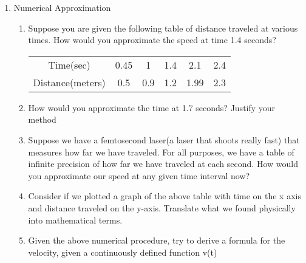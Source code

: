\documentclass{article}
\begin{document}
\begin{enumerate}
    \item Numerical Approximation
    \begin{enumerate}
        \item Suppose you are given the following table of distance traveled at various times. How would you approximate the speed at time 1.4 seconds?
        \begin{center}
            \begin{tabular}{ c c c c c c}
             Time(sec)        & 0.45  &   1   & 1.4  & 2.1  & 2.4\\ 
             Distance(meters) & 0.5   &  0.9  &  1.2 & 1.99 & 2.3\\  
            \end{tabular}
        \end{center}
        \item How would you approximate the time at 1.7 seconds? Justify your method
        \item Suppose we have a femtosecond laser(a laser that shoots really fast) that measures how far we have traveled. For all purposes, we have a table of infinite precision of how far we have traveled at each second. How would you approximate our speed at any given time interval now?
        \item Consider if we plotted a graph of the above table with time on the x axis and distance traveled on the y-axis. Translate what we found physically into mathematical terms.
        \item Given the above numerical procedure, try to derive a formula for the velocity, given a continuously defined function v(t)
    \end{enumerate}


\end{enumerate}
\end{document}
